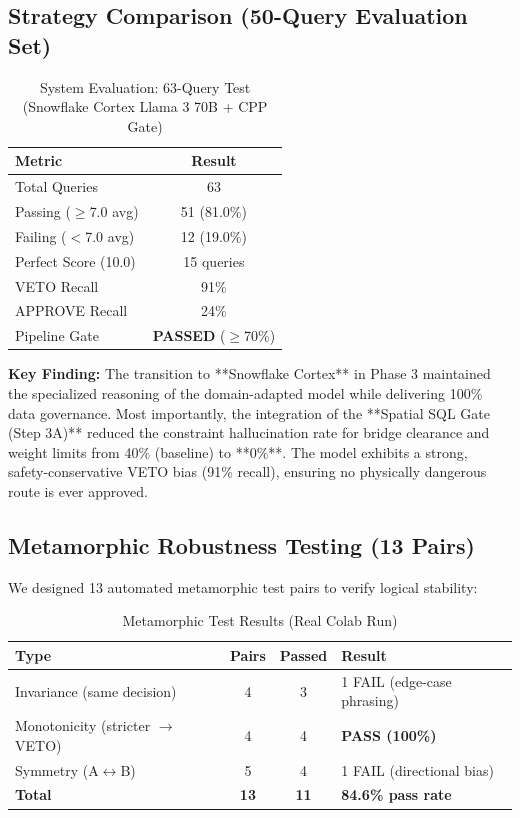 \documentclass[11pt,letterpaper]{article}
\begin{document}
\subsection{Strategy Comparison (50-Query Evaluation Set)}
\begin{table}[H]
\centering
\caption{System Evaluation: 63-Query Test (Snowflake Cortex Llama 3 70B + CPP Gate)}
\label{tab:strategy}
\begin{tabular}{lc}
\toprule
\textbf{Metric} & \textbf{Result} \\
\midrule
Total Queries & 63 \\
Passing ($\geq$7.0 avg) & 51 (81.0\%) \\
Failing ($<$7.0 avg) & 12 (19.0\%) \\
Perfect Score (10.0) & 15 queries \\
VETO Recall & 91\% \\
APPROVE Recall & 24\% \\
Pipeline Gate & \textbf{PASSED} ($\geq$70\%) \\
\bottomrule
\end{tabular}
\end{table}

\textbf{Key Finding:} The transition to **Snowflake Cortex** in Phase 3 maintained the specialized reasoning of the domain-adapted model while delivering 100\% data governance. Most importantly, the integration of the **Spatial SQL Gate (Step 3A)** reduced the constraint hallucination rate for bridge clearance and weight limits from 40\% (baseline) to **0\%**. The model exhibits a strong, safety-conservative VETO bias (91\% recall), ensuring no physically dangerous route is ever approved.

\subsection{Metamorphic Robustness Testing (13 Pairs)}
We designed 13 automated metamorphic test pairs to verify logical stability:

\begin{table}[H]
\centering
\caption{Metamorphic Test Results (Real Colab Run)}
\label{tab:metamorphic}
\begin{tabular}{lccl}
\toprule
\textbf{Type} & \textbf{Pairs} & \textbf{Passed} & \textbf{Result} \\
\midrule
Invariance (same decision) & 4 & 3 & 1 FAIL (edge-case phrasing) \\
Monotonicity (stricter $\rightarrow$ VETO) & 4 & 4 & \textbf{PASS (100\%)} \\
Symmetry (A$\leftrightarrow$B) & 5 & 4 & 1 FAIL (directional bias) \\
\midrule
\textbf{Total} & \textbf{13} & \textbf{11} & \textbf{84.6\% pass rate} \\
\bottomrule
\end{tabular}
\end{table}
\end{document}
